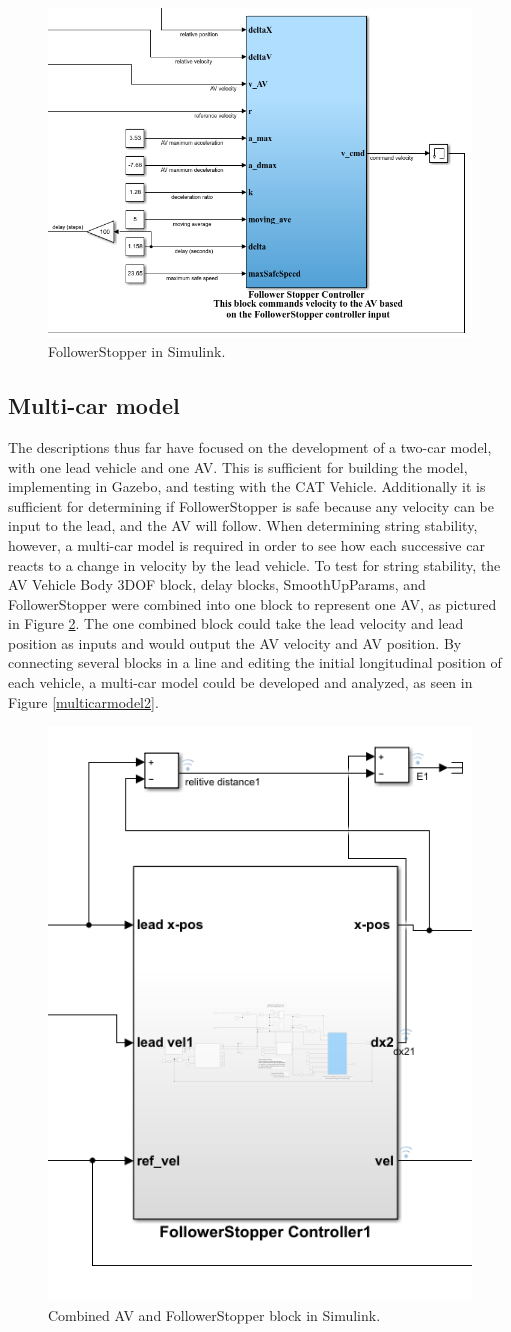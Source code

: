 \documentclass[conference]{IEEEtran}
\begin{document}
\begin{figure}[htbp]
\centerline{\includegraphics[width=3.5 in]{followerstopper.png}}
\caption{FollowerStopper in Simulink.}
\label{fig2}
\end{figure}

\subsection{Multi-car model}
The descriptions thus far have focused on the development of a two-car model, with one lead vehicle and one AV. This is sufficient for building the model, implementing in Gazebo, and testing with the CAT Vehicle. Additionally it is sufficient for determining if FollowerStopper is safe because any velocity can be input to the lead, and the AV will follow. When determining string stability, however, a multi-car model is required in order to see how each successive car reacts to a change in velocity by the lead vehicle. To test for string stability, the AV Vehicle Body 3DOF block, delay blocks, SmoothUpParams, and FollowerStopper were combined into one block to represent one AV, as pictured in Figure \ref{multicarmodel1}. The one combined block could take the lead velocity and lead position as inputs and would output the AV velocity and AV position. By connecting several blocks in a line and editing the initial longitudinal position of each vehicle, a multi-car model could be developed and analyzed, as seen in Figure \ref{multicarmodel2}.

\begin{figure}[htbp]
\centerline{\includegraphics[width=2 in]{7carmodelblock.png}}
\caption{Combined AV and FollowerStopper block in Simulink.}
\label{multicarmodel1}
\end{figure}
\end{document}
